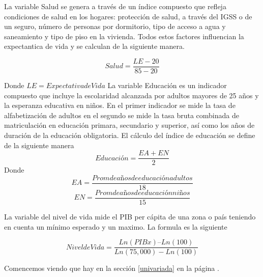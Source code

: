 \documentclass{article}
\begin{document}
La variable Salud se genera a través de un índice compuesto que refleja condiciones de salud en los hogares: protección de salud, a través del IGSS o de un seguro, número de personas por dormitorio, tipo de acceso a agua y saneamiento y tipo de piso en la vivienda. Todos estos factores influencian la expectantica de vida y se calculan de la siguiente manera.

\[ Salud=\frac{LE-20} {85-20} \]

Donde $LE = Expectativa de Vida$
La variable Educación es un indicador compuesto que incluye la escolaridad alcanzada por adultos mayores de 25 años y la esperanza educativa en niños. En el primer indicador se mide la tasa de alfabetización de adultos en el segundo se mide la tasa bruta combinada de matriculación en educación primara, secundario y superior, así como los años de duración de la educación obligatoria. El cálculo del índice de educación se define de la siguiente manera
\[Educación= \frac{EA + EN} {2} \]
Donde
\[EA= \frac{Prom de años de educación adultos} {18}  \]
\[EN= \frac{Prom de años de educación niños} {15}  \]

La variable del nivel de vida mide el PIB per cápita de una zona o país teniendo en cuenta un mínimo esperado y un maximo. La formula es la siguiente

\[Nivel de Vida = \frac {Ln(PIBx) – Ln (100)} {Ln(75,000)-Ln(100)} \]





Comencemos viendo que hay en la sección \ref{univariada} en la página \pageref{univariada}.

\clearpage


\clearpage





\renewcommand{\refname}{Bibliography}

\end{document}
